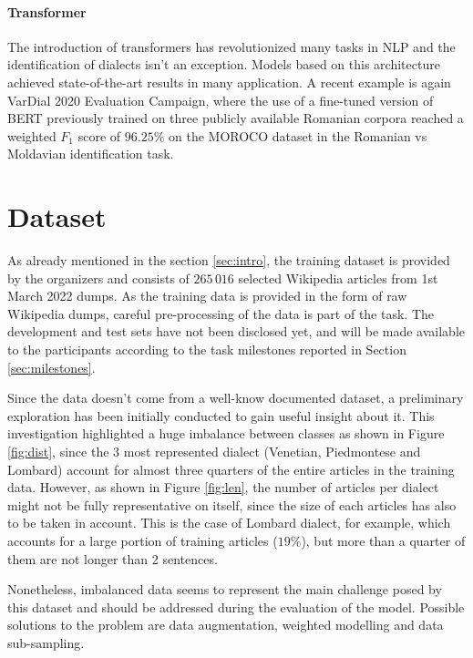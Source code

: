 \documentclass[11pt]{article}
\begin{document}
        \paragraph{Transformer}
        The introduction of transformers \cite{NIPS2017_3f5ee243} has revolutionized many tasks in NLP and the identification of dialects isn't an exception. Models based on this architecture achieved state-of-the-art results in many application. A recent example is again VarDial 2020 Evaluation Campaign, where the use of a fine-tuned version of BERT previously trained on three publicly available Romanian corpora \cite{zaharia-etal-2020-exploring} reached a weighted $F_1$ score of $96.25 \%$ on the MOROCO dataset \cite{moroco} in the Romanian vs Moldavian identification task. 
        
\section{Dataset}%
As already mentioned in the section \ref{sec:intro}, the training dataset is provided by the organizers and consists of $265 \, 016$ selected Wikipedia articles from 1st March 2022 dumps. 
As the training data is provided in the form of raw Wikipedia dumps, careful pre-processing of the data is part of the task.
The development and test sets have not been disclosed yet, and will be made available to the participants according to the task milestones reported in Section \ref{sec:milestones}.

Since the data doesn't come from a well-know documented dataset, a preliminary exploration has been initially conducted to gain useful insight about it. This investigation highlighted a huge imbalance between classes as shown in Figure \ref{fig:dist}, since the 3 most represented dialect (Venetian, Piedmontese and Lombard) account for almost three quarters of the entire articles in the training data.
However, as shown in Figure \ref{fig:len}, the number of articles per dialect might not be fully representative on itself, since the size of each articles has also to be taken in account. This is the case of Lombard dialect, for example, which accounts for a large portion of training articles ($19\%$), but more than a quarter of them are not longer than 2 sentences.

Nonetheless, imbalanced data seems to represent the main challenge posed by this dataset and should be addressed during the evaluation of the model.
Possible solutions to the problem are data augmentation, weighted modelling and data sub-sampling.
\end{document}
